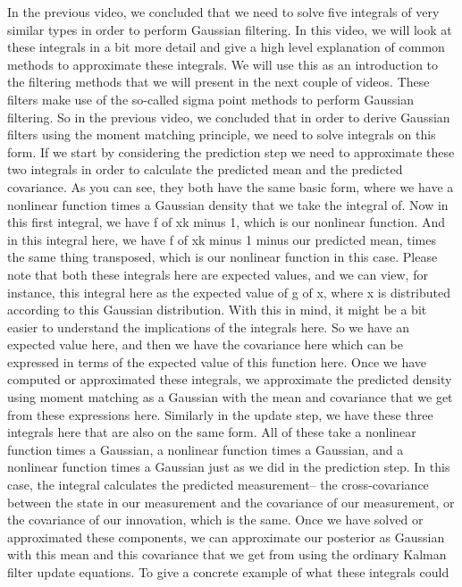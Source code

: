 In the previous video, we concluded
that we need to solve five integrals of very similar types
in order to perform Gaussian filtering.
In this video, we will look at these integrals
in a bit more detail and give a high level
explanation of common methods to approximate these integrals.
We will use this as an introduction to the filtering
methods that we will present in the next couple of videos.
These filters make use of the so-called sigma point methods
to perform Gaussian filtering.
So in the previous video, we concluded
that in order to derive Gaussian filters using the moment
matching principle, we need to solve integrals on this form.
If we start by considering the prediction step
we need to approximate these two integrals in order
to calculate the predicted mean and the predicted covariance.
As you can see, they both have the same basic form,
where we have a nonlinear function times a Gaussian
density that we take the integral of.
Now in this first integral, we have
f of xk minus 1, which is our nonlinear function.
And in this integral here, we have f of xk minus 1
minus our predicted mean, times the same thing
transposed, which is our nonlinear
function in this case.
Please note that both these integrals here
are expected values, and we can view, for instance,
this integral here as the expected value
of g of x, where x is distributed according
to this Gaussian distribution.
With this in mind, it might be a bit easier
to understand the implications of the integrals here.
So we have an expected value here,
and then we have the covariance here
which can be expressed in terms of the expected value
of this function here.
Once we have computed or approximated these integrals,
we approximate the predicted density using moment matching
as a Gaussian with the mean and covariance
that we get from these expressions here.
Similarly in the update step, we have these three integrals here
that are also on the same form.
All of these take a nonlinear function times a Gaussian,
a nonlinear function times a Gaussian,
and a nonlinear function times a Gaussian
just as we did in the prediction step.
In this case, the integral calculates
the predicted measurement-- the cross-covariance
between the state in our measurement
and the covariance of our measurement,
or the covariance of our innovation, which is the same.
Once we have solved or approximated these components,
we can approximate our posterior as Gaussian
with this mean and this covariance
that we get from using the ordinary Kalman
filter update equations.
To give a concrete example of what these integrals could
